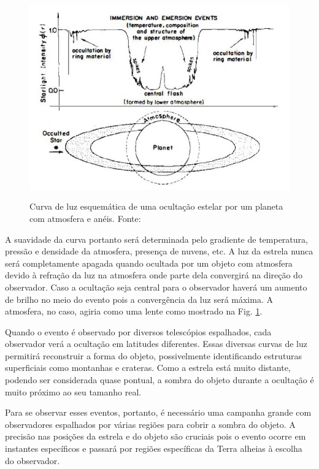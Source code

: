\documentclass[12pt,a4paper]{monografia}
\begin{document}
\begin{figure}[h]
\begin{centering}
\includegraphics[scale=0.75]{figuras/stellarocc.png} 
\label{Fig: occ-scheme}
\caption{Curva de luz esquemática de uma ocultação estelar por um planeta com atmosfera e anéis. Fonte: \cite{Elliot1979}}
\end{centering} 
\end{figure}

A suavidade da curva portanto será determinada pelo gradiente de temperatura, pressão e densidade da atmosfera, presença de nuvens, etc. A luz da estrela nunca será completamente apagada quando ocultada por um objeto com atmosfera devido à refração da luz na atmosfera onde parte dela convergirá na direção do observador. Caso a ocultação seja central para o observador haverá um aumento de brilho no meio do evento pois a convergência da luz será máxima. A atmosfera, no caso, agiria como uma lente como mostrado na Fig. \ref{Fig: occ-scheme}.

Quando o evento é observado por diversos telescópios espalhados, cada observador verá a ocultação em latitudes diferentes. Essas diversas curvas de luz permitirá reconstruir a forma do objeto, possivelmente identificando estruturas superficiais como montanhas e crateras. Como a estrela está muito distante, podendo ser considerada quase pontual, a sombra do objeto durante a ocultação é muito próximo ao seu tamanho real.

Para se observar esses eventos, portanto, é necessário uma campanha grande com observadores espalhados por várias regiões para cobrir a sombra do objeto. A precisão nas posições da estrela e do objeto são cruciais pois o evento ocorre em instantes específicos e passará por regiões específicas da Terra alheias à escolha do observador.
\end{document}
